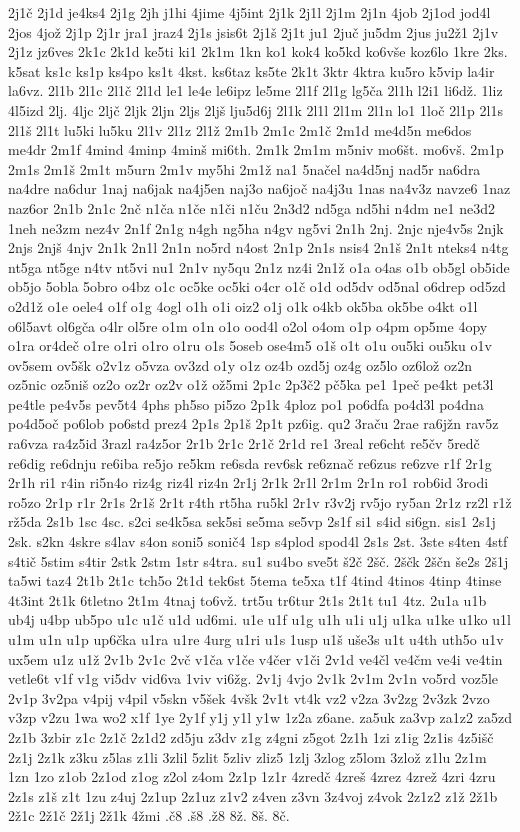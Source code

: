 {2j1č
2j1d
je4ks4
2j1g
2jh
j1hi
4jime
4j5int
2j1k
2j1l
2j1m
2j1n
4job
2j1od
jod4l
2jos
4jož
2j1p
2j1r
jra1
jraz4
2j1s
jsis6t
2j1š
2j1t
ju1
2juč
ju5dm
2jus
ju2ž1
2j1v
2j1z
jz6ves
2k1c
2k1d
ke5ti
ki1
2k1m
1kn
ko1
kok4
ko5kd
ko6vše
koz6lo
1kre
2ks.
k5sat
ks1c
ks1p
ks4po
ks1t
4kst.
ks6taz
ks5te
2k1t
3ktr
4ktra
ku5ro
k5vip
la4ir
la6vz.
2l1b
2l1c
2l1č
2l1d
le1
le4e
le6ipz
le5me
2l1f
2l1g
lg5ča
2l1h
l2i1
li6dž.
1liz
4l5izd
2lj.
4ljc
2ljč
2ljk
2ljn
2ljs
2ljš
lju5d6j
2l1k
2l1l
2l1m
2l1n
lo1
1loč
2l1p
2l1s
2l1š
2l1t
lu5ki
lu5ku
2l1v
2l1z
2l1ž
2m1b
2m1c
2m1č
2m1d
me4d5n
me6dos
me4dr
2m1f
4mind
4minp
4minš
mi6th.
2m1k
2m1m
m5niv
mo6št.
mo6vš.
2m1p
2m1s
2m1š
2m1t
m5urn
2m1v
my5hi
2m1ž
na1
5načel
na4d5nj
nad5r
na6dra
na4dre
na6dur
1naj
na6jak
na4j5en
naj3o
na6joč
na4j3u
1nas
na4v3z
navze6
1naz
naz6or
2n1b
2n1c
2nč
n1ča
n1če
n1či
n1ču
2n3d2
nd5ga
nd5hi
n4dm
ne1
ne3d2
1neh
ne3zm
nez4v
2n1f
2n1g
n4gh
ng5ha
n4gv
ng5vi
2n1h
2nj.
2njc
nje4v5s
2njk
2njs
2njš
4njv
2n1k
2n1l
2n1n
no5rd
n4ost
2n1p
2n1s
nsis4
2n1š
2n1t
nteks4
n4tg
nt5ga
nt5ge
n4tv
nt5vi
nu1
2n1v
ny5qu
2n1z
nz4i
2n1ž
o1a
o4as
o1b
ob5gl
ob5ide
ob5jo
5obla
5obro
o4bz
o1c
oc5ke
oc5ki
o4cr
o1č
o1d
od5dv
od5nal
o6drep
od5zd
o2d1ž
o1e
oele4
o1f
o1g
4ogl
o1h
o1i
oiz2
o1j
o1k
o4kb
ok5ba
ok5be
o4kt
o1l
o6l5avt
ol6gča
o4lr
ol5re
o1m
o1n
o1o
ood4l
o2ol
o4om
o1p
o4pm
op5me
4opy
o1ra
or4deč
o1re
o1ri
o1ro
o1ru
o1s
5oseb
ose4m5
o1š
o1t
o1u
ou5ki
ou5ku
o1v
ov5sem
ov5šk
o2v1z
o5vza
ov3zd
o1y
o1z
oz4b
ozd5j
oz4g
oz5lo
oz6lož
oz2n
oz5nic
oz5niš
oz2o
oz2r
oz2v
o1ž
ož5mi
2p1c
2p3č2
pč5ka
pe1
1peč
pe4kt
pet3l
pe4tle
pe4v5s
pev5t4
4phs
ph5so
pi5zo
2p1k
4ploz
po1
po6dfa
po4d3l
po4dna
po4d5oč
po6lob
po6std
prez4
2p1s
2p1š
2p1t
pz6ig.
qu2
3raču
2rae
ra6jžn
rav5z
ra6vza
ra4z5id
3razl
ra4z5or
2r1b
2r1c
2r1č
2r1d
re1
3real
re6cht
re5čv
5redč
re6dig
re6dnju
re6iba
re5jo
re5km
re6sda
rev6sk
re6znač
re6zus
re6zve
r1f
2r1g
2r1h
ri1
r4in
ri5n4o
riz4g
riz4l
riz4n
2r1j
2r1k
2r1l
2r1m
2r1n
ro1
rob6id
3rodi
ro5zo
2r1p
r1r
2r1s
2r1š
2r1t
r4th
rt5ha
ru5kl
2r1v
r3v2j
rv5jo
ry5an
2r1z
rz2l
r1ž
rž5da
2s1b
1sc
4sc.
s2ci
se4k5sa
sek5si
se5ma
se5vp
2s1f
si1
s4id
si6gn.
sis1
2s1j
2sk.
s2kn
4skre
s4lav
s4on
soni5
sonič4
1sp
s4plod
spod4l
2s1s
2st.
3ste
s4ten
4stf
s4tič
5stim
s4tir
2stk
2stm
1str
s4tra.
su1
su4bo
sve5t
š2č
2šč.
2ščk
2ščn
še2s
2š1j
ta5wi
taz4
2t1b
2t1c
tch5o
2t1d
tek6st
5tema
te5xa
t1f
4tind
4tinos
4tinp
4tinse
4t3int
2t1k
6tletno
2t1m
4tnaj
to6vž.
trt5u
tr6tur
2t1s
2t1t
tu1
4tz.
2u1a
u1b
ub4j
u4bp
ub5po
u1c
u1č
u1d
ud6mi.
u1e
u1f
u1g
u1h
u1i
u1j
u1ka
u1ke
u1ko
u1l
u1m
u1n
u1p
up6čka
u1ra
u1re
4urg
u1ri
u1s
1usp
u1š
uše3s
u1t
u4th
uth5o
u1v
ux5em
u1z
u1ž
2v1b
2v1c
2vč
v1ča
v1če
v4čer
v1či
2v1d
ve4čl
ve4čm
ve4i
ve4tin
vetle6t
v1f
v1g
vi5dv
vid6va
1viv
vi6žg.
2v1j
4vjo
2v1k
2v1m
2v1n
vo5rd
voz5le
2v1p
3v2pa
v4pij
v4pil
v5skn
v5šek
4všk
2v1t
vt4k
vz2
v2za
3v2zg
2v3zk
2vzo
v3zp
v2zu
1wa
wo2
x1f
1ye
2y1f
y1j
y1l
y1w
1z2a
z6ane.
za5uk
za3vp
za1z2
za5zd
2z1b
3zbir
z1c
2z1č
2z1d2
zd5ju
z3dv
z1g
z4gni
z5got
2z1h
1zi
z1ig
2z1is
4z5išč
2z1j
2z1k
z3ku
z5las
z1li
3zlil
5zlit
5zliv
zliz5
1zlj
3zlog
z5lom
3zlož
z1lu
2z1m
1zn
1zo
z1ob
2z1od
z1og
z2ol
z4om
2z1p
1z1r
4zredč
4zreš
4zrez
4zrež
4zri
4zru
2z1s
z1š
z1t
1zu
z4uj
2z1up
2z1uz
z1v2
z4ven
z3vn
3z4voj
z4vok
2z1z2
z1ž
2ž1b
2ž1c
2ž1č
2ž1j
2ž1k
4žmi
.č8
.š8
.ž8
8ž.
8š.
8č.
}
